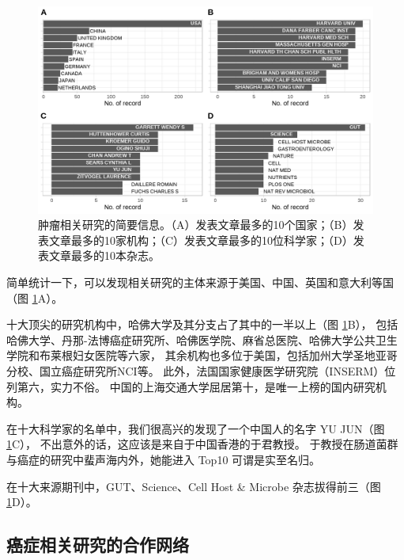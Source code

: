 \documentclass[]{ctexbook}
\begin{document}
\begin{figure}
\includegraphics[width=1\linewidth]{plots/crc-four-dimension-barplot-1} \caption{肿瘤相关研究的简要信息。（A）发表文章最多的10个国家；（B）发表文章最多的10家机构；（C）发表文章最多的10位科学家；（D）发表文章最多的10本杂志。}\label{fig:crc-four-dimension-barplot}
\end{figure}

简单统计一下，可以发现相关研究的主体来源于美国、中国、英国和意大利等国（图 \ref{fig:crc-four-dimension-barplot}A）。

十大顶尖的研究机构中，哈佛大学及其分支占了其中的一半以上（图 \ref{fig:crc-four-dimension-barplot}B），
包括哈佛大学、丹那-法博癌症研究所、哈佛医学院、麻省总医院、哈佛大学公共卫生学院和布莱根妇女医院等六家，
其余机构也多位于美国，包括加州大学圣地亚哥分校、国立癌症研究所NCI等。
此外，法国国家健康医学研究院（INSERM）位列第六，实力不俗。
中国的上海交通大学屈居第十，是唯一上榜的国内研究机构。

在十大科学家的名单中，我们很高兴的发现了一个中国人的名字 YU JUN（图 \ref{fig:crc-four-dimension-barplot}C），
不出意外的话，这应该是来自于中国香港的于君教授。
于教授在肠道菌群与癌症的研究中蜚声海内外，她能进入 Top10 可谓是实至名归。

在十大来源期刊中，GUT、Science、Cell Host \& Microbe 杂志拔得前三（图 \ref{fig:crc-four-dimension-barplot}D）。

\hypertarget{ux764cux75c7ux76f8ux5173ux7814ux7a76ux7684ux5408ux4f5cux7f51ux7edc}{%
\subsection{癌症相关研究的合作网络}\label{ux764cux75c7ux76f8ux5173ux7814ux7a76ux7684ux5408ux4f5cux7f51ux7edc}}
\end{document}

